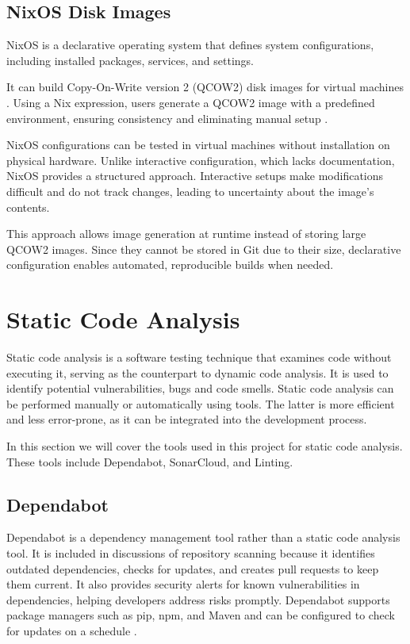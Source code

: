 \subsection{NixOS Disk Images}
NixOS is a declarative operating system that defines system configurations, including installed packages, services, and settings.

It can build Copy-On-Write version 2 (QCOW2) disk images for virtual machines \Parencite{nixos_vm_configuration}. Using a Nix expression, users generate a QCOW2 image with a predefined environment, ensuring consistency and eliminating manual setup \Parencite{nix_language_tutorial}.

NixOS configurations can be tested in virtual machines without installation on physical hardware. Unlike interactive configuration, which lacks documentation, NixOS provides a structured approach. Interactive setups make modifications difficult and do not track changes, leading to uncertainty about the image's contents.

This approach allows image generation at runtime instead of storing large QCOW2 images. Since they cannot be stored in Git due to their size, declarative configuration enables automated, reproducible builds when needed.

\section{Static Code Analysis}
Static code analysis is a software testing technique that examines code without executing it, serving as the counterpart to dynamic code analysis. It is used to identify potential vulnerabilities, bugs and code smells. Static code analysis can be performed manually or automatically using tools. The latter is more efficient and less error-prone, as it can be integrated into the development process.

In this section we will cover the tools used in this project for static code analysis. These tools include Dependabot, SonarCloud, and Linting.

\subsection{Dependabot}
Dependabot is a dependency management tool rather than a static code analysis tool. It is included in discussions of repository scanning because it identifies outdated dependencies, checks for updates, and creates pull requests to keep them current. It also provides security alerts for known vulnerabilities in dependencies, helping developers address risks promptly. Dependabot supports package managers such as pip, npm, and Maven and can be configured to check for updates on a schedule \Parencite{GitHubDependabotVersion2025}.

